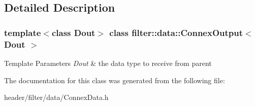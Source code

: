 \subsection{Detailed Description}
\subsubsection*{template$<$class Dout$>$\newline
class filter\+::data\+::\+Connex\+Output$<$ Dout $>$}


\begin{DoxyTemplParams}{Template Parameters}
{\em Dout} & the data type to receive from parent \\
\hline
\end{DoxyTemplParams}


The documentation for this class was generated from the following file\+:\begin{DoxyCompactItemize}
\item 
header/filter/data/Connex\+Data.\+h\end{DoxyCompactItemize}

